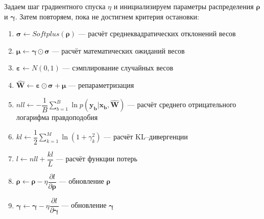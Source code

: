 \documentclass{article}
\numberwithin{equation}{section}
\begin{document}
    Задаем шаг градиентного спуска $\eta$ и инициализируем параметры распределения
    $\pmb{\rho}$ и $\pmb{\gamma}$.
    Затем повторяем, пока не достигнем критерия остановки:
    \begin{enumerate}
        \item
            $
                \pmb{\sigma}
                \leftarrow
                Softplus(\pmb{\rho})
            $ --- расчёт среднеквадратических отклонений весов
        \item
            $
                \pmb{\mu}
                \leftarrow
                    \pmb{\gamma}
                    \odot
                    \pmb{\sigma}
            $ --- расчёт математических ожиданий весов
        \item
            $
                \pmb{\varepsilon}
                \leftarrow
                N(0, 1)
            $ --- сэмплирование случайных весов
        \item
            $
                \hat{\pmb{W}}
                \leftarrow
                    \pmb{\varepsilon}
                    \odot
                    \pmb{\sigma}
                    +
                    \pmb{\mu}
            $ --- репараметризация
        \item
            $
                nll
                \leftarrow
                    -\dfrac{1}{B}
                    \sum_{b=1}^{B}{
                        \ln{
                            p(
                                \pmb{y_{b}} | \pmb{x_{b}}, \pmb{\hat{W}}
                            )
                        }
                    }
            $ --- расчёт среднего отрицательного логарифма правдоподобия
        \item
            $
                kl
                \leftarrow
                    \dfrac{1}{2}
                    \sum_{k=1}^{M}
                    \ln(
                        {1 + \gamma_{k}^{2}}
                    )
            $ --- расчёт KL--дивергенции
        \item
            $
                l
                \leftarrow
                    nll + \dfrac{kl}{L}
            $ --- расчёт функции потерь
        \item
            $
                \pmb{\rho}
                \leftarrow
                    \pmb{\rho}
                    -
                    \eta
                    \dfrac
                        {\partial l}
                        {\partial \pmb{\rho}}
            $ --- обновление $\pmb{\rho}$
        \item
            $
                \pmb{\gamma}
                \leftarrow
                    \pmb{\gamma}
                    -
                    \eta
                    \dfrac
                        {\partial l}
                        {\partial \pmb{\gamma}}
            $ --- обновление $\pmb{\gamma}$
    \end{enumerate}
\end{document}
